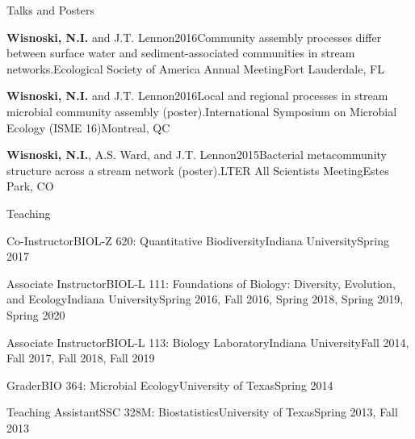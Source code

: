 \documentclass{resume} %
\begin{document}
\begin{rhangSection}{Talks and Posters}
  \begin{Presentation}{{\bf Wisnoski, N.I.} and J.T. Lennon}{2016}{Community assembly processes differ between surface water and sediment-associated communities in stream networks.}{Ecological Society of America Annual Meeting}{Fort Lauderdale, FL}
  \end{Presentation}

  \begin{Presentation}{{\bf Wisnoski, N.I.} and J.T. Lennon}{2016}{Local and regional processes in stream microbial community assembly (poster).}{International Symposium on Microbial Ecology (ISME 16)}{Montreal, QC}
  \end{Presentation}

  \begin{Presentation}{{\bf Wisnoski, N.I.}, A.S. Ward, and J.T. Lennon}{2015}{Bacterial metacommunity structure across a stream network (poster).}{LTER All Scientists Meeting}{Estes Park, CO}
  \end{Presentation}

\end{rhangSection}

\bigskip

\begin{rSection}{Teaching}

\begin{Course}
  {Co-Instructor}{BIOL-Z 620: Quantitative Biodiversity}{Indiana University}{Spring 2017}
\end{Course}

\begin{Course}
  {Associate Instructor}{BIOL-L 111: Foundations of Biology: Diversity, Evolution, and Ecology}{Indiana University}{Spring 2016, Fall 2016, Spring 2018, Spring 2019, Spring 2020}
\end{Course}

\begin{Course}
  {Associate Instructor}{BIOL-L 113: Biology Laboratory}{Indiana University}{Fall 2014, Fall 2017, Fall 2018, Fall 2019}
\end{Course}

\begin{Course}
  {Grader}{BIO 364: Microbial Ecology}{University of Texas}{Spring 2014}
\end{Course}

\begin{Course}
  {Teaching Assistant}{SSC 328M: Biostatistics}{University of Texas}{Spring 2013, Fall 2013}
\end{Course}

\end{rSection}
\end{document}
